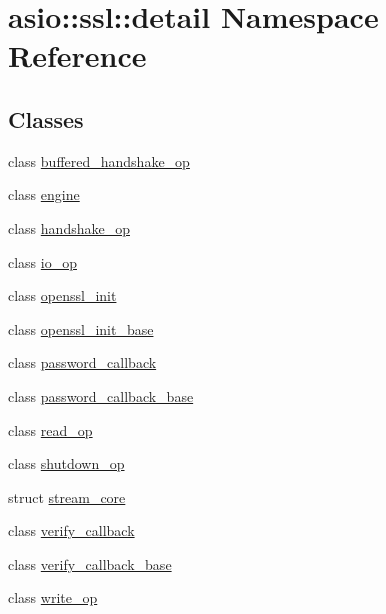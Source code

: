 \hypertarget{namespaceasio_1_1ssl_1_1detail}{}\section{asio\+:\+:ssl\+:\+:detail Namespace Reference}
\label{namespaceasio_1_1ssl_1_1detail}
\subsection*{Classes}
\begin{DoxyCompactItemize}
\item 
class \hyperlink{classasio_1_1ssl_1_1detail_1_1buffered__handshake__op}{buffered\+\_\+handshake\+\_\+op}
\item 
class \hyperlink{classasio_1_1ssl_1_1detail_1_1engine}{engine}
\item 
class \hyperlink{classasio_1_1ssl_1_1detail_1_1handshake__op}{handshake\+\_\+op}
\item 
class \hyperlink{classasio_1_1ssl_1_1detail_1_1io__op}{io\+\_\+op}
\item 
class \hyperlink{classasio_1_1ssl_1_1detail_1_1openssl__init}{openssl\+\_\+init}
\item 
class \hyperlink{classasio_1_1ssl_1_1detail_1_1openssl__init__base}{openssl\+\_\+init\+\_\+base}
\item 
class \hyperlink{classasio_1_1ssl_1_1detail_1_1password__callback}{password\+\_\+callback}
\item 
class \hyperlink{classasio_1_1ssl_1_1detail_1_1password__callback__base}{password\+\_\+callback\+\_\+base}
\item 
class \hyperlink{classasio_1_1ssl_1_1detail_1_1read__op}{read\+\_\+op}
\item 
class \hyperlink{classasio_1_1ssl_1_1detail_1_1shutdown__op}{shutdown\+\_\+op}
\item 
struct \hyperlink{structasio_1_1ssl_1_1detail_1_1stream__core}{stream\+\_\+core}
\item 
class \hyperlink{classasio_1_1ssl_1_1detail_1_1verify__callback}{verify\+\_\+callback}
\item 
class \hyperlink{classasio_1_1ssl_1_1detail_1_1verify__callback__base}{verify\+\_\+callback\+\_\+base}
\item 
class \hyperlink{classasio_1_1ssl_1_1detail_1_1write__op}{write\+\_\+op}
\end{DoxyCompactItemize}
